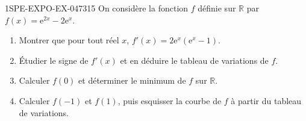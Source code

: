 \begin{exercice}{1SPE-EXPO-EX-047}{3}{15}
On considère la fonction $f$ définie sur $\mathbb{R}$ par $f(x) = \mathrm{e}^{2x} - 2\mathrm{e}^x$.
\begin{enumerate}
\item Montrer que pour tout réel $x$, $f'(x) = 2\mathrm{e}^x(\mathrm{e}^x - 1)$.
\item Étudier le signe de $f'(x)$ et en déduire le tableau de variations de $f$.
\item Calculer $f(0)$ et déterminer le minimum de $f$ sur $\mathbb{R}$.
\item Calculer $f(-1)$ et $f(1)$, puis esquisser la courbe de $f$ à partir du tableau de variations.
\end{enumerate}
\end{exercice}
